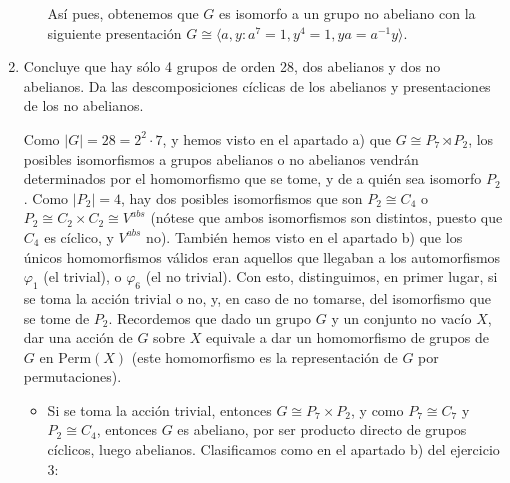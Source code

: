 \documentclass[12pt]{article}
\begin{document}
\begin{ejercicio}
\begin{enumerate}[label=(\alph*)]
\begin{itemize}
                Así pues, obtenemos que $G$ es isomorfo a un grupo no abeliano con la siguiente presentación $G \cong \langle a,y : a^7 = 1,  y^4 = 1, ya = a^{-1}y \rangle$.
            \end{itemize}

            \newpage

            \item Concluye que hay sólo 4 grupos de orden 28, dos abelianos y dos no abelianos. Da las descomposiciones cíclicas de los abelianos y presentaciones de los no abelianos.
            
            Como $|G| = 28 = 2^2 \cdot 7$, y hemos visto en el apartado a) que $G \cong P_7 \rtimes P_2$, los posibles isomorfismos a grupos abelianos o no abelianos vendrán determinados por el homomorfismo que se tome, y de a quién sea isomorfo $P_2$. Como $|P_2| = 4$, hay dos posibles isomorfismos
            que son $P_2 \cong C_4$ o $P_2 \cong C_2 \times C_2 \cong V^{abs}$ (nótese que ambos isomorfismos son distintos, puesto que $C_4$ es cíclico, y $V^{abs}$ no). También hemos visto en el apartado b) que los únicos homomorfismos válidos eran aquellos que llegaban a los automorfismos
            $\varphi_1$ (el trivial), o $\varphi_6$ (el no trivial). Con esto, distinguimos, en primer lugar, si se toma la acción trivial o no, y, en caso de no tomarse, del isomorfismo que se tome de $P_2$. Recordemos que dado un grupo $G$ y un conjunto no vacío $X$, dar una acción de $G$ sobre $X$
            equivale a dar un homomorfismo de grupos de $G$ en $\text{Perm}(X)$ (este homomorfismo es la representación de $G$ por permutaciones).
            
            \begin{itemize}
                \item Si se toma la acción trivial, entonces $G \cong P_7 \times P_2$, y como $P_7 \cong C_7$ y $P_2 \cong C_4$, entonces $G$ es abeliano, por ser producto directo de grupos cíclicos, luego abelianos. Clasificamos como en el apartado b) del ejercicio 3:
                

\end{itemize}
\end{enumerate}
\end{ejercicio}
\end{document}
